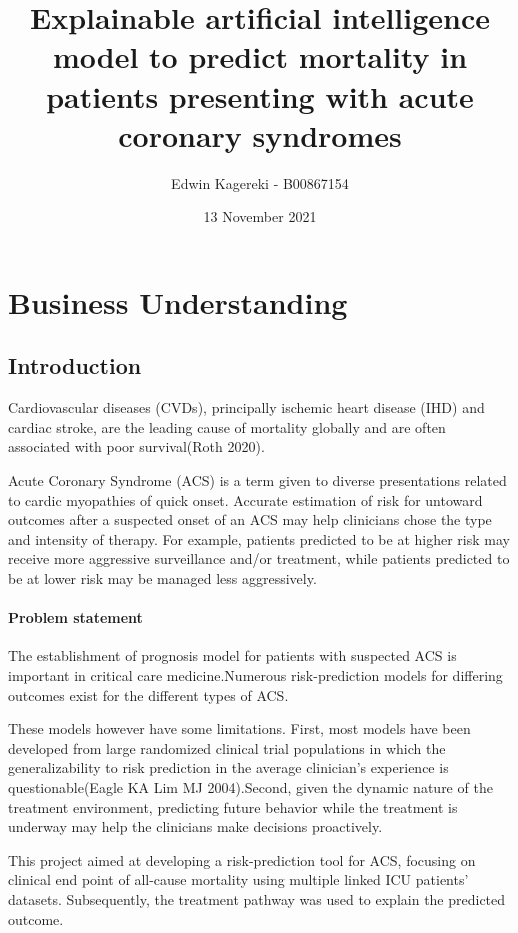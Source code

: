 \documentclass[
]{article}
\title{Explainable artificial intelligence model to predict mortality in
patients presenting with acute coronary syndromes}
\subtitle{Edwin Kagereki - B00867154}
\author{}
\date{\vspace{-2.5em}13 November 2021}
\begin{document}
\maketitle

{
\setcounter{tocdepth}{2}
\tableofcontents
}
\hypertarget{business-understanding}{%
\section{Business Understanding}\label{business-understanding}}

\hypertarget{introduction}{%
\subsection{Introduction}\label{introduction}}

Cardiovascular diseases (CVDs), principally ischemic heart disease (IHD)
and cardiac stroke, are the leading cause of mortality globally and are
often associated with poor survival(Roth 2020).

Acute Coronary Syndrome (ACS) is a term given to diverse presentations
related to cardic myopathies of quick onset. Accurate estimation of risk
for untoward outcomes after a suspected onset of an ACS may help
clinicians chose the type and intensity of therapy. For example,
patients predicted to be at higher risk may receive more aggressive
surveillance and/or treatment, while patients predicted to be at lower
risk may be managed less aggressively.

\hypertarget{problem-statement}{%
\paragraph{Problem statement}\label{problem-statement}}

The establishment of prognosis model for patients with suspected ACS is
important in critical care medicine.Numerous risk-prediction models for
differing outcomes exist for the different types of ACS.

These models however have some limitations. First, most models have been
developed from large randomized clinical trial populations in which the
generalizability to risk prediction in the average clinician's
experience is questionable(Eagle KA Lim MJ 2004).Second, given the
dynamic nature of the treatment environment, predicting future behavior
while the treatment is underway may help the clinicians make decisions
proactively.

This project aimed at developing a risk-prediction tool for ACS,
focusing on clinical end point of all-cause mortality using multiple
linked ICU patients' datasets. Subsequently, the treatment pathway was
used to explain the predicted outcome.
\end{document}
